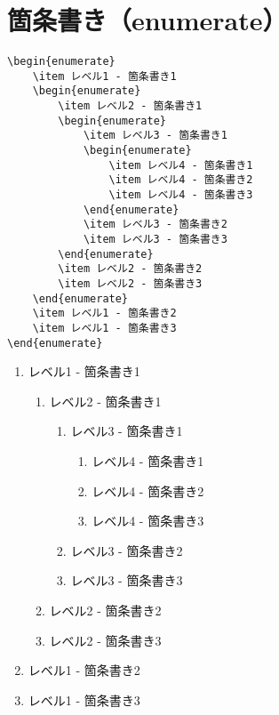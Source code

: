 \section{箇条書き（enumerate）}

\begin{verbatim}
\begin{enumerate}
    \item レベル1 - 箇条書き1
    \begin{enumerate}
        \item レベル2 - 箇条書き1
        \begin{enumerate}
            \item レベル3 - 箇条書き1
            \begin{enumerate}
                \item レベル4 - 箇条書き1
                \item レベル4 - 箇条書き2
                \item レベル4 - 箇条書き3
            \end{enumerate}
            \item レベル3 - 箇条書き2
            \item レベル3 - 箇条書き3
        \end{enumerate}
        \item レベル2 - 箇条書き2
        \item レベル2 - 箇条書き3
    \end{enumerate}
    \item レベル1 - 箇条書き2
    \item レベル1 - 箇条書き3
\end{enumerate}
\end{verbatim}

\begin{enumerate}
    \item レベル1 - 箇条書き1
    \begin{enumerate}
        \item レベル2 - 箇条書き1
        \begin{enumerate}
            \item レベル3 - 箇条書き1
            \begin{enumerate}
                \item レベル4 - 箇条書き1
                \item レベル4 - 箇条書き2
                \item レベル4 - 箇条書き3
            \end{enumerate}
            \item レベル3 - 箇条書き2
            \item レベル3 - 箇条書き3
        \end{enumerate}
        \item レベル2 - 箇条書き2
        \item レベル2 - 箇条書き3
    \end{enumerate}
    \item レベル1 - 箇条書き2
    \item レベル1 - 箇条書き3
\end{enumerate}
